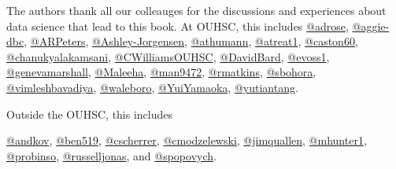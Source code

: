 \documentclass[
]{book}
\begin{document}
The authors thank all our colleauges for the discussions and experiences about data science that lead to this book. At OUHSC, this includes
\href{https://github.com/adrose}{@adrose},
\href{https://github.com/aggie-dbc}{@aggie-dbc},
\href{https://github.com/ARPeters}{@ARPeters},
\href{https://github.com/Ashley-Jorgensen}{@Ashley-Jorgensen},
\href{https://github.com/athumann}{@athumann},
\href{https://github.com/atreat1}{@atreat1},
\href{https://github.com/caston60}{@caston60},
\href{https://github.com/chanukyalakamsani}{@chanukyalakamsani},
\href{https://github.com/CWilliamsOUHSC}{@CWilliamsOUHSC},
\href{https://github.com/DavidBard}{@DavidBard},
\href{https://github.com/evoss1}{@evoss1},
\href{https://github.com/genevamarshall}{@genevamarshall},
\href{https://github.com/Maleeha}{@Maleeha},
\href{https://github.com/man9472}{@man9472},
\href{https://github.com/rmatkins}{@rmatkins},
\href{https://github.com/sbohora}{@sbohora},
\href{https://github.com/vimleshbavadiya}{@vimleshbavadiya},
\href{https://github.com/waleboro}{@waleboro},
\href{https://github.com/YuiYamaoka}{@YuiYamaoka},
\href{https://github.com/yutiantang}{@yutiantang}.

Outside the OUHSC, this includes

\href{https://github.com/andkov}{@andkov},
\href{https://github.com/ben519}{@ben519},
\href{https://github.com/cscherrer}{@cscherrer},
\href{https://github.com/cmodzelewski}{@cmodzelewski},
\href{https://github.com/jimquallen}{@jimquallen},
\href{https://github.com/mhunter1}{@mhunter1},
\href{https://github.com/probinso}{@probinso},
\href{https://github.com/russelljonas}{@russelljonas}, and
\href{https://github.com/spopovych}{@spopovych}.

\backmatter
  
\end{document}
